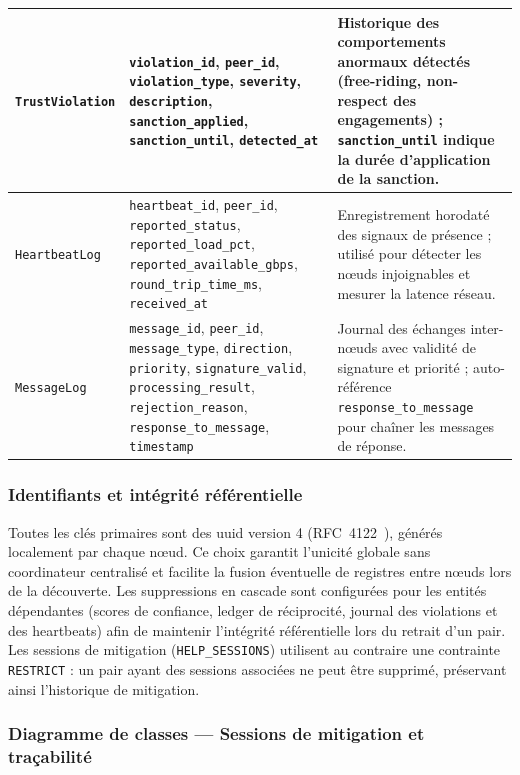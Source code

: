 \begin{longtable}{|
>{\raggedright\arraybackslash}p{4.0cm}|
>{\raggedright\arraybackslash}p{6.2cm}|
>{\raggedright\arraybackslash}p{4.0cm}|}
\texttt{TrustViolation} &
\texttt{violation\_id}, \texttt{peer\_id}, \texttt{violation\_type}, \texttt{severity}, \texttt{description}, \texttt{sanction\_applied}, \texttt{sanction\_until}, \texttt{detected\_at} &
Historique des comportements anormaux détectés (free-riding, non-respect des engagements) ; \texttt{sanction\_until} indique la durée d'application de la sanction. \\
\hline

\texttt{HeartbeatLog} &
\texttt{heartbeat\_id}, \texttt{peer\_id}, \texttt{reported\_status}, \texttt{reported\_load\_pct}, \texttt{reported\_available\_gbps}, \texttt{round\_trip\_time\_ms}, \texttt{received\_at} &
Enregistrement horodaté des signaux de présence ; utilisé pour détecter les nœuds injoignables et mesurer la latence réseau. \\
\hline

\texttt{MessageLog} &
\texttt{message\_id}, \texttt{peer\_id}, \texttt{message\_type}, \texttt{direction}, \texttt{priority}, \texttt{signature\_valid}, \texttt{processing\_result}, \texttt{rejection\_reason}, \texttt{response\_to\_message}, \texttt{timestamp} &
Journal des échanges inter-nœuds avec validité de signature et priorité ; auto-référence \texttt{response\_to\_message} pour chaîner les messages de réponse. \\
\hline

\end{longtable}




\subsubsection{Identifiants et intégrité référentielle}

Toutes les clés primaires sont des \gls{uuid} version 4 (RFC~4122~\parencite{rfc4122uuid}), générés localement par chaque nœud. Ce choix garantit l'unicité globale sans coordinateur centralisé et facilite la fusion éventuelle de registres entre nœuds lors de la découverte. Les suppressions en cascade sont configurées pour les entités dépendantes
(scores de confiance, ledger de réciprocité, journal des violations et
des heartbeats) afin de maintenir l'intégrité référentielle lors du retrait
d'un pair. Les sessions de mitigation (\texttt{HELP\_SESSIONS}) utilisent
au contraire une contrainte \texttt{RESTRICT} : un pair ayant des sessions
associées ne peut être supprimé, préservant ainsi l'historique de mitigation.


\FloatBarrier
\subsubsection{Diagramme de classes — Sessions de mitigation et traçabilité}

